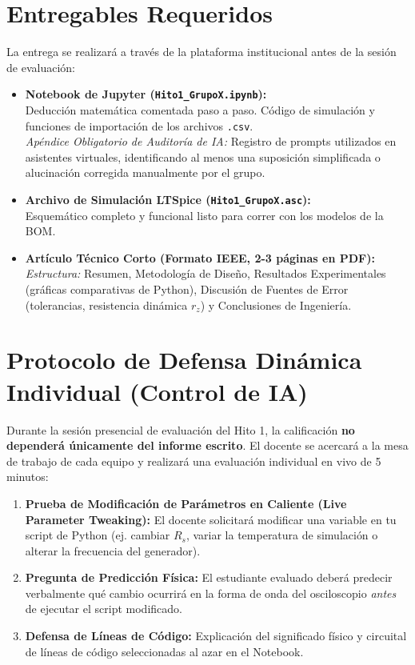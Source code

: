 \documentclass[11pt, a4paper]{article}
\begin{document}
\newpage
\section{Entregables Requeridos}
La entrega se realizará a través de la plataforma institucional antes de la sesión de evaluación:

\begin{itemize}
    \item[\faFileCode] \textbf{Notebook de Jupyter (\texttt{Hito1\_GrupoX.ipynb}):}\\
    Deducción matemática comentada paso a paso. Código de simulación y funciones de importación de los archivos \texttt{.csv}.\\
    \textit{Apéndice Obligatorio de Auditoría de IA:} Registro de prompts utilizados en asistentes virtuales, identificando al menos una suposición simplificada o alucinación corregida manualmente por el grupo.
    \item[\faBolt] \textbf{Archivo de Simulación LTSpice (\texttt{Hito1\_GrupoX.asc}):}\\
    Esquemático completo y funcional listo para correr con los modelos de la BOM.
    \item[\faFilePdf] \textbf{Artículo Técnico Corto (Formato IEEE, 2-3 páginas en PDF):}\\
    \textit{Estructura:} Resumen, Metodología de Diseño, Resultados Experimentales (gráficas comparativas de Python), Discusión de Fuentes de Error (tolerancias, resistencia dinámica $r_z$) y Conclusiones de Ingeniería.
\end{itemize}

\section{Protocolo de Defensa Dinámica Individual (Control de IA)}
Durante la sesión presencial de evaluación del Hito 1, la calificación \textbf{no dependerá únicamente del informe escrito}. El docente se acercará a la mesa de trabajo de cada equipo y realizará una evaluación individual en vivo de 5 minutos:

\begin{enumerate}
    \item \textbf{Prueba de Modificación de Parámetros en Caliente (Live Parameter Tweaking):} El docente solicitará modificar una variable en tu script de Python (ej. cambiar $R_s$, variar la temperatura de simulación o alterar la frecuencia del generador).
    \item \textbf{Pregunta de Predicción Física:} El estudiante evaluado deberá predecir verbalmente qué cambio ocurrirá en la forma de onda del osciloscopio \textit{antes} de ejecutar el script modificado.
    \item \textbf{Defensa de Líneas de Código:} Explicación del significado físico y circuital de líneas de código seleccionadas al azar en el Notebook.
\end{enumerate}
\end{document}

